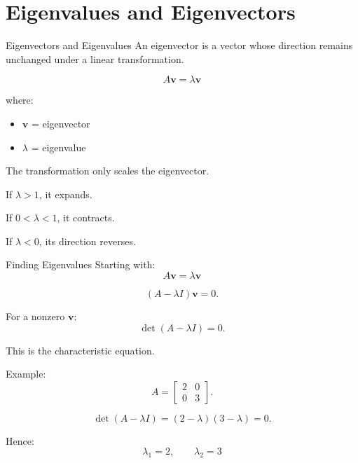 \documentclass[aspectratio=169]{beamer}
\begin{document}
\section{Eigenvalues and Eigenvectors}

\begin{frame}{Eigenvectors and Eigenvalues}
An eigenvector is a vector whose direction remains unchanged under a linear transformation.

\[
\boxed{
A\mathbf v=\lambda\mathbf v
}
\]

where:

\begin{itemize}
\item $\mathbf v$ = eigenvector
\item $\lambda$ = eigenvalue
\end{itemize}

The transformation only scales the eigenvector.

If $\lambda>1$, it expands.

If $0<\lambda<1$, it contracts.

If $\lambda<0$, its direction reverses.
\end{frame}

\begin{frame}{Finding Eigenvalues}
Starting with:
\[
A\mathbf v=\lambda\mathbf v
\]

\[
(A-\lambda I)\mathbf v=0.
\]

For a nonzero $\mathbf v$:
\[
\det(A-\lambda I)=0.
\]

This is the characteristic equation.

Example:
\[
A=
\begin{bmatrix}
2&0\\0&3
\end{bmatrix}.
\]

\[
\det(A-\lambda I)
=
(2-\lambda)(3-\lambda)=0.
\]

Hence:
\[
\boxed{\lambda_1=2,\qquad\lambda_2=3}
\]
\end{frame}
\end{document}
